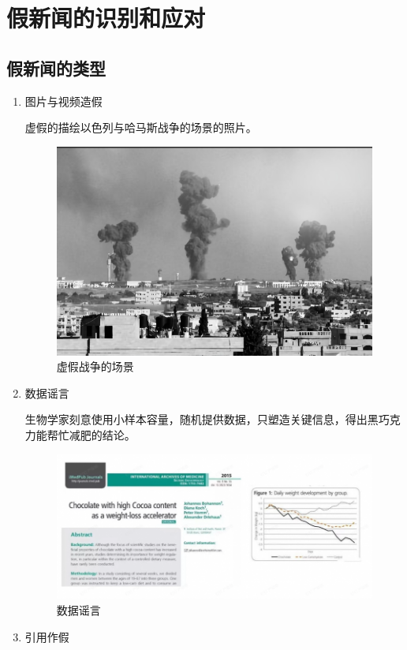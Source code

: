 \section{假新闻的识别和应对}
\subsection{假新闻的类型}
\begin{enumerate}
  \item 图片与视频造假

  虚假的描绘以色列与哈马斯战争的场景的照片。
  \begin{figure}[H]
    \centering
    \includegraphics[width=.7\textwidth]{figures/假新闻/哈马斯.png}
    \caption{虚假战争的场景}
  \end{figure}
  \item 数据谣言

  生物学家刻意使用小样本容量，随机提供数据，只塑造关键信息，得出黑巧克力能帮忙减肥的结论。
  \begin{figure}[H]
    \centering
    \includegraphics[width=.7\textwidth]{figures/假新闻/减肥.png}
    \caption{数据谣言}
  \end{figure}

  \item 引用作假


\end{enumerate}
